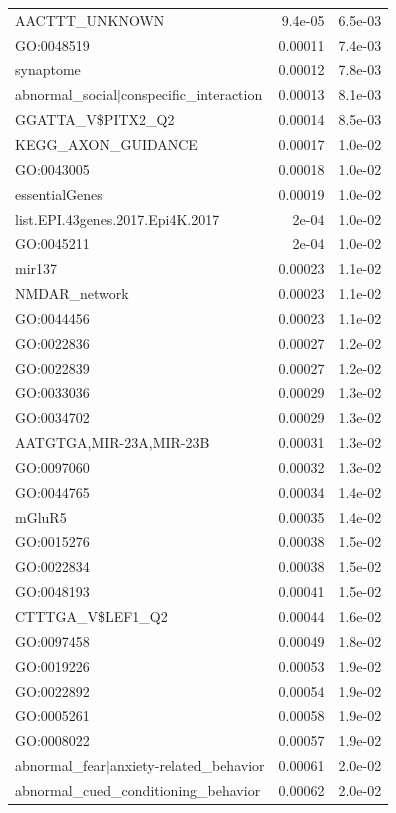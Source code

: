 \documentclass[]{article}
\begin{document}
\begin{longtable}{|l|r|r|}
AACTTT\_UNKNOWN  &  9.4e-05  &  6.5e-03 \\
GO:0048519  &  0.00011  &  7.4e-03 \\
synaptome  &  0.00012  &  7.8e-03 \\
abnormal\_social$|$conspecific\_interaction  &  0.00013  &  8.1e-03 \\
GGATTA\_V\$PITX2\_Q2  &  0.00014  &  8.5e-03 \\
KEGG\_AXON\_GUIDANCE  &  0.00017  &  1.0e-02 \\
GO:0043005  &  0.00018  &  1.0e-02 \\
essentialGenes  &  0.00019  &  1.0e-02 \\
list.EPI.43genes.2017.Epi4K.2017  &  2e-04  &  1.0e-02 \\
GO:0045211  &  2e-04  &  1.0e-02 \\
mir137  &  0.00023  &  1.1e-02 \\
NMDAR\_network  &  0.00023  &  1.1e-02 \\
GO:0044456  &  0.00023  &  1.1e-02 \\
GO:0022836  &  0.00027  &  1.2e-02 \\
GO:0022839  &  0.00027  &  1.2e-02 \\
GO:0033036  &  0.00029  &  1.3e-02 \\
GO:0034702  &  0.00029  &  1.3e-02 \\
AATGTGA,MIR-23A,MIR-23B  &  0.00031  &  1.3e-02 \\
GO:0097060  &  0.00032  &  1.3e-02 \\
GO:0044765  &  0.00034  &  1.4e-02 \\
mGluR5  &  0.00035  &  1.4e-02 \\
GO:0015276  &  0.00038  &  1.5e-02 \\
GO:0022834  &  0.00038  &  1.5e-02 \\
GO:0048193  &  0.00041  &  1.5e-02 \\
CTTTGA\_V\$LEF1\_Q2  &  0.00044  &  1.6e-02 \\
GO:0097458  &  0.00049  &  1.8e-02 \\
GO:0019226  &  0.00053  &  1.9e-02 \\
GO:0022892  &  0.00054  &  1.9e-02 \\
GO:0005261  &  0.00058  &  1.9e-02 \\
GO:0008022  &  0.00057  &  1.9e-02 \\
abnormal\_fear$|$anxiety-related\_behavior  &  0.00061  &  2.0e-02 \\
abnormal\_cued\_conditioning\_behavior  &  0.00062  &  2.0e-02 \\

\end{longtable}
\end{document}
